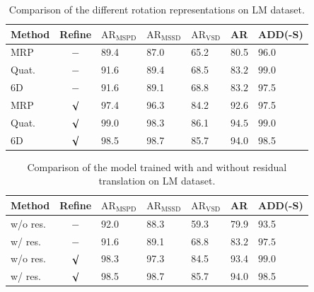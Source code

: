 \documentclass[12pt,DIV14,BCOR12mm,a4paper,footinclude=false,headinclude,parskip=half-,twoside,openright,cleardoublepage=empty,toc=index,bibliography=totoc,listof=totoc]{scrreprt}
\numberwithin{equation}{chapter}
\begin{document}
\begin{table}[H]
  \centering
  \caption{Comparison of the different rotation representations on LM dataset.}
  \label{tab:ab_rot_lm}
  \begin{tabular}{l | c | C{16mm} C{16mm} C{16mm}| C{16mm}| C{16mm}}
      \toprule
      Method & Refine & $\text{AR}_{\text{MSPD}}$ & $\text{AR}_{\text{MSSD}}$ & $\text{AR}_{\text{VSD}}$ & AR & ADD(-S) \\
      \midrule
      MRP   & $-$     & 89.4 & 87.0 & 65.2 & 80.5 & 96.0 \\
      Quat. & $-$     & 91.6 & 89.4 & 68.5 & $\mathbf{83.2}$ & $\mathbf{99.0}$ \\
      6D    & $-$     & 91.6 & 89.1 & 68.8 & $\mathbf{83.2}$ & 97.5 \\
      MRP   & $\surd$ & 97.4 & 96.3 & 84.2 & 92.6 & 97.5 \\
      Quat. & $\surd$ & 99.0 & 98.3 & 86.1 & $\mathbf{94.5}$ & $\mathbf{99.0}$ \\
      6D    & $\surd$ & 98.5 & 98.7 & 85.7 & 94.0 & 98.5 \\
      \bottomrule
  \end{tabular}
\end{table}

\begin{table}[H]
  \centering
  \caption{Comparison of the model trained with and without residual translation on LM dataset.}
  \label{tab:ab_trans_lm}
  \begin{tabular}{l | c | C{16mm} C{16mm} C{16mm}| C{16mm}| C{16mm}}
      \toprule
      Method & Refine & $\text{AR}_{\text{MSPD}}$ & $\text{AR}_{\text{MSSD}}$ & $\text{AR}_{\text{VSD}}$ & AR & ADD(-S) \\
      \midrule
      w/o res. & $-$     & 92.0 & 88.3 & 59.3 & 79.9 & 93.5 \\
      w/ res.  & $-$     & 91.6 & 89.1 & 68.8 & $\mathbf{83.2}$ & $\mathbf{97.5}$ \\
      w/o res. & $\surd$ & 98.3 & 97.3 & 84.5 & 93.4 & $\mathbf{99.0}$ \\
      w/ res.  & $\surd$ & 98.5 & 98.7 & 85.7 & $\mathbf{94.0}$ & 98.5 \\
      \bottomrule
  \end{tabular}
\end{table}

\newpage
\end{document}
